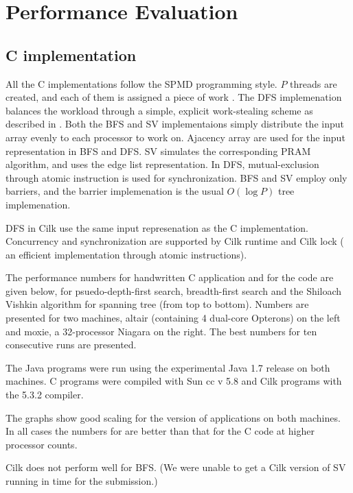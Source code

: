 \section{Performance Evaluation}\label{s:results}

\subsection{C implementation}
All the C implementations follow the SPMD programming style.  $P$
threads are created, and each of them is assigned a piece of work .
The DFS implemenation balances the workload through a simple, explicit
work-stealing scheme as described in \cite{BL94}.  Both the BFS and SV
implementaions simply distribute the input array evenly to each
processor to work on.  Ajacency array are used for the input
representation in BFS and DFS.  SV simulates the corresponding PRAM
algorithm, and uses the edge list representation.  In DFS,
mutual-exclusion through atomic instruction is used for
synchronization.  BFS and SV employ only barriers, and the barrier
implemenation is the usual $O(\log P)$ tree implemenation.

DFS in Cilk use the same input represenation as the C implementation.
Concurrency and synchronization are supported by Cilk runtime and Cilk
lock ( an efficient implementation through atomic instructions).

The performance numbers for handwritten C application and for the
\XWS{} code are given below, for psuedo-depth-first search,
breadth-first search and the Shiloach Vishkin algorithm for spanning
tree (from top to bottom). Numbers are presented for two machines,
altair (containing 4 dual-core Opterons) on the left and moxie, a
32-processor Niagara on the right. The best numbers for ten
consecutive runs are presented.

The Java programs were run using the experimental Java 1.7 release on
both machines. C programs were compiled with Sun cc v 5.8 and Cilk
programs with the 5.3.2 compiler.

The graphs show good scaling for the \XWS{} version of applications on
both machines. In all cases the numbers for \XWS{} are better than
that for the C code at higher processor counts.

Cilk does not perform well for BFS. (We were unable to get a Cilk
version of SV running in time for the submission.) 


